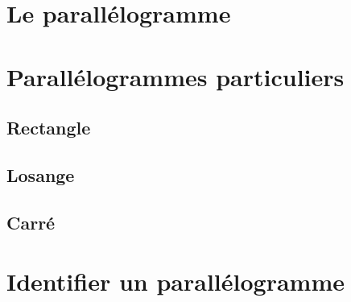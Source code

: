 \documentclass[12pt,a4paper]{article}
\date{}
\title{}
\begin{document}







\section{Le parallélogramme}

%



\section{Parallélogrammes particuliers}

	\subsection{Rectangle}
		
		
		
	\subsection{Losange}
		
	
	\subsection{Carré}
		

\newpage
	
\section{Identifier un parallélogramme}	
	
	
	
	
\end{document}
